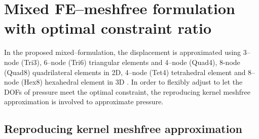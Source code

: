 \section{Mixed FE--meshfree formulation with optimal constraint ratio}

In the proposed mixed--formulation, the displacement is approximated using 3--node (Tri3), 6--node (Tri6) triangular elements and 4--node (Quad4), 8-node (Quad8) quadrilateral elements in 2D, 4--node (Tet4) tetrahedral element and 8--node (Hex8) hexahedral element in 3D \cite{hughes2000}. In order to flexibly adjust to let the DOFs of pressure meet the optimal constraint, the reproducing kernel meshfree approximation is involved to approximate pressure.

\subsection{Reproducing kernel meshfree approximation}

